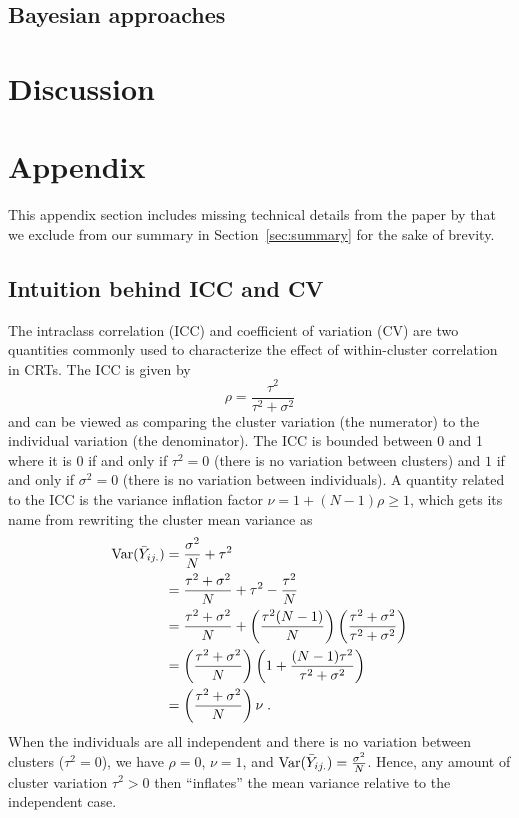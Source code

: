 \documentclass[10pt]{article}
\begin{document}
\subsection{Bayesian approaches}


\section{Discussion} \label{sec:discussion}


\newpage


\printbibliography


\newpage


\appendix
\section{Appendix} \label{apx}

This appendix section includes missing technical details from the paper by \textcite{Hussey:2007} that we exclude from our summary in Section~\ref{sec:summary} for the sake of brevity.

\subsection{Intuition behind ICC and CV} \label{apx:correlation}

The intraclass correlation (ICC) and coefficient of variation (CV) are two quantities commonly used to characterize the effect of within-cluster correlation in CRTs. The ICC is given by
\[
\rho = \frac{\tau^2}{\tau^2+\sigma^2}
\]
and can be viewed as comparing the cluster variation (the numerator) to the individual variation (the denominator). The ICC is bounded between 0 and 1 where it is 0 if and only if $\tau^2=0$ (there is no variation between clusters) and $1$ if and only if $\sigma^2=0$ (there is no variation between individuals). A quantity related to the ICC is the variance inflation factor $\nu=1+(N-1)\rho\geq1$, which gets its name from rewriting the cluster mean variance as
\begin{align*}
\mathrm{Var}(\bar{Y}_{ij.}) &= \frac{\sigma^2}{N} + \tau^2 \\
&= \frac{\tau^2+\sigma^2}{N} + \tau^2 - \frac{\tau^2}{N} \\
&= \frac{\tau^2+\sigma^2}{N} + \left(\frac{\tau^2(N-1)}{N}\right)\left(\frac{\tau^2+\sigma^2}{\tau^2+\sigma^2}\right) \\
&= \left(\frac{\tau^2+\sigma^2}{N}\right)\left(1+\frac{(N-1)\tau^2}{\tau^2+\sigma^2}\right) \\
&= \left(\frac{\tau^2+\sigma^2}{N}\right)\nu \;.
\end{align*}
When the individuals are all independent and there is no variation between clusters ($\tau^2=0$), we have $\rho=0$, $\nu=1$, and $\mathrm{Var}(\bar{Y}_{ij.})=\frac{\sigma^2}{N}$. Hence, any amount of cluster variation $\tau^2>0$ then ``inflates'' the mean variance relative to the independent case.
\\
\end{document}
